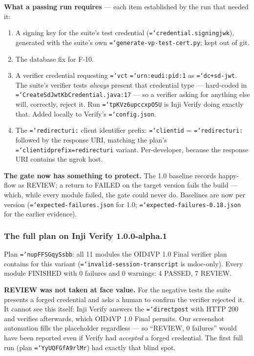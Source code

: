 \documentclass[11pt,a4paper]{article}
\newcommand{\tightlist}{\setlength{\itemsep}{0pt}\setlength{\parskip}{0pt}\setlength{\parsep}{0pt}}
\let\origtexttt\texttt
\renewcommand{\texttt}[1]{\origtexttt{\hyphenchar\font=`\-\relax #1}}
\renewcommand{\_}{\textunderscore\allowbreak}
\begin{document}
\textbf{What a passing run requires} --- each item established by the run that needed it:
\begin{enumerate}\tightlist
  \item A signing key for the suite's test credential (\texttt{credential.signing\_jwk}),
        generated with the suite's own \texttt{generate-vp-test-cert.py}; kept out of git.
  \item The database fix for F-10.
  \item A verifier credential requesting \texttt{vct} \texttt{urn:eudi:pid:1} as
        \texttt{dc+sd-jwt}. The suite's verifier tests \emph{always} present that credential
        type --- hard-coded in \texttt{CreateSdJwtKbCredential.java:17} --- so a verifier asking
        for anything else will, correctly, reject it. Run \texttt{tpKVz6upccxpO5U} is Inji Verify
        doing exactly that. Added locally to Verify's \texttt{config.json}.
  \item The \texttt{redirect\_uri:} client identifier prefix: \texttt{client\_id} =
        \texttt{redirect\_uri:} followed by the response URI, matching the plan's
        \texttt{client\_id\_prefix=redirect\_uri} variant. Per-developer, because the response
        URI contains the ngrok host.
\end{enumerate}

\textbf{The gate now has something to protect.} The 1.0 baseline records happy-flow as
REVIEW; a return to FAILED on the target version fails the build --- which, while every
module failed, the gate could never do. Baselines are now per version
(\texttt{expected-failures.json} for 1.0; \texttt{expected-failures-0.18.json} for the
earlier evidence).

\subsubsection*{The full plan on Inji Verify 1.0.0-alpha.1}

Plan \texttt{nupFFSGqySsbb}: all 11 modules the OID4VP 1.0 Final verifier plan contains for this
variant (\texttt{invalid-session-transcript} is mdoc-only). Every module FINISHED with 0
failures and 0 warnings: 4 PASSED, 7 REVIEW.

\textbf{REVIEW was not taken at face value.} For the negative tests the suite presents a forged
credential and asks a human to confirm the verifier rejected it. It cannot see this itself:
Inji Verify answers the \texttt{direct\_post} with HTTP 200 and verifies afterwards, which OID4VP
1.0 Final permits. Our screenshot automation fills the placeholder regardless --- so ``REVIEW, 0
failures'' would have been reported even if Verify had \emph{accepted} a forged credential. The
first full run (plan \texttt{YyUQFGfA9rlMr}) had exactly that blind spot.
\end{document}
